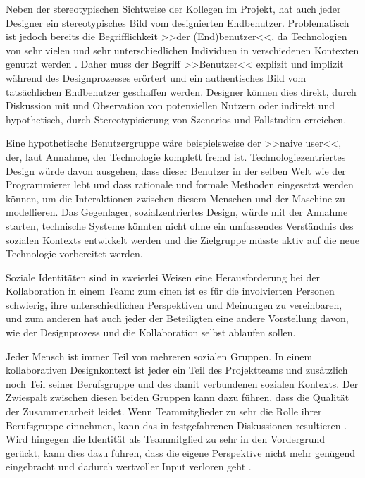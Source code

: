 \medskip Neben der stereotypischen Sichtweise der Kollegen im Projekt, hat auch jeder Designer ein stereotypisches Bild vom designierten Endbenutzer. Problematisch ist jedoch bereits die Begrifflichkeit >>der (End)benutzer<<, da Technologien von sehr vielen und sehr unterschiedlichen Individuen in verschiedenen Kontexten genutzt werden \citep{Agre:1995}. Daher muss der Begriff >>Benutzer<< explizit und implizit während des Designprozesses erörtert und ein authentisches Bild vom tatsächlichen Endbenutzer geschaffen werden. Designer können dies direkt, durch Diskussion mit und Observation von potenziellen Nutzern oder indirekt und hypothetisch, durch Stereotypisierung von Szenarios und Fallstudien erreichen.

\medskip Eine hypothetische Benutzergruppe wäre beispielsweise der >>naive user<<, der, laut Annahme, der Technologie komplett fremd ist. Technologiezentriertes Design würde davon ausgehen, dass dieser Benutzer in der selben Welt wie der Programmierer lebt und dass rationale und formale Methoden eingesetzt werden können, um die Interaktionen zwischen diesem Menschen und der Maschine zu modellieren. Das Gegenlager, sozialzentriertes Design, würde mit der Annahme starten, technische Systeme könnten nicht ohne ein umfassendes Verständnis des sozialen Kontexts entwickelt werden und die Zielgruppe müsste aktiv auf die neue Technologie vorbereitet werden.

\medskip Soziale Identitäten sind in zweierlei Weisen eine Herausforderung bei der Kollaboration in einem Team: zum einen ist es für die involvierten Personen schwierig, ihre unterschiedlichen Perspektiven und Meinungen zu vereinbaren, und zum anderen hat auch jeder der Beteiligten eine andere Vorstellung davon, wie der Designprozess und die Kollaboration selbst ablaufen sollen.

Jeder Mensch ist immer Teil von mehreren sozialen Gruppen. In einem kollaborativen Designkontext ist jeder ein Teil des Projektteams und zusätzlich noch Teil seiner Berufsgruppe und des damit verbundenen sozialen Kontexts. Der Zwiespalt zwischen diesen beiden Gruppen kann dazu führen, dass die Qualität der Zusammenarbeit leidet. Wenn Teammitglieder zu sehr die Rolle ihrer Berufsgruppe einnehmen, kann das in festgefahrenen Diskussionen resultieren \citep{Kilker:1999}. Wird hingegen die Identität als Teammitglied zu sehr in den Vordergrund gerückt, kann dies dazu führen, dass die eigene Perspektive nicht mehr genügend eingebracht und dadurch wertvoller Input verloren geht \citep{Irving:1982}.

